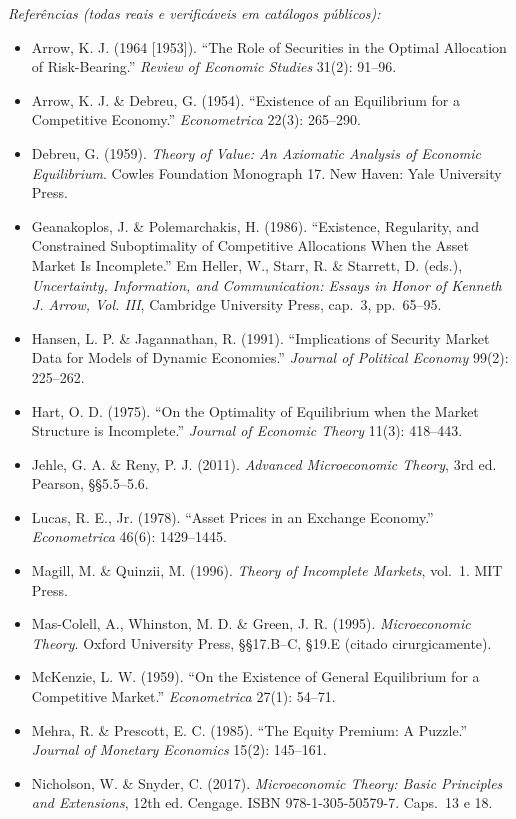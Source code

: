 \documentclass[11pt,addpoints]{exam}
\begin{document}
\begin{contextbox}
\medskip
\textit{Referências (todas reais e verificáveis em catálogos públicos):}
\begin{itemize}[noitemsep,topsep=0pt]
\item Arrow, K. J. (1964 [1953]). ``The Role of Securities in the Optimal Allocation of Risk-Bearing.'' \textit{Review of Economic Studies} 31(2): 91--96.
\item Arrow, K. J. \& Debreu, G. (1954). ``Existence of an Equilibrium for a Competitive Economy.'' \textit{Econometrica} 22(3): 265--290.
\item Debreu, G. (1959). \textit{Theory of Value: An Axiomatic Analysis of Economic Equilibrium}. Cowles Foundation Monograph 17. New Haven: Yale University Press.
\item Geanakoplos, J. \& Polemarchakis, H. (1986). ``Existence, Regularity, and Constrained Suboptimality of Competitive Allocations When the Asset Market Is Incomplete.'' Em Heller, W., Starr, R. \& Starrett, D. (eds.), \textit{Uncertainty, Information, and Communication: Essays in Honor of Kenneth J. Arrow, Vol. III}, Cambridge University Press, cap.~3, pp.~65--95.
\item Hansen, L. P. \& Jagannathan, R. (1991). ``Implications of Security Market Data for Models of Dynamic Economies.'' \textit{Journal of Political Economy} 99(2): 225--262.
\item Hart, O. D. (1975). ``On the Optimality of Equilibrium when the Market Structure is Incomplete.'' \textit{Journal of Economic Theory} 11(3): 418--443.
\item Jehle, G. A. \& Reny, P. J. (2011). \textit{Advanced Microeconomic Theory}, 3rd ed. Pearson, §§5.5--5.6.
\item Lucas, R. E., Jr. (1978). ``Asset Prices in an Exchange Economy.'' \textit{Econometrica} 46(6): 1429--1445.
\item Magill, M. \& Quinzii, M. (1996). \textit{Theory of Incomplete Markets}, vol.~1. MIT Press.
\item Mas-Colell, A., Whinston, M. D. \& Green, J. R. (1995). \textit{Microeconomic Theory}. Oxford University Press, §§17.B--C, §19.E (citado cirurgicamente).
\item McKenzie, L. W. (1959). ``On the Existence of General Equilibrium for a Competitive Market.'' \textit{Econometrica} 27(1): 54--71.
\item Mehra, R. \& Prescott, E. C. (1985). ``The Equity Premium: A Puzzle.'' \textit{Journal of Monetary Economics} 15(2): 145--161.
\item Nicholson, W. \& Snyder, C. (2017). \textit{Microeconomic Theory: Basic Principles and Extensions}, 12th ed. Cengage. ISBN 978-1-305-50579-7. Caps.~13 e 18.

\end{itemize}
\end{contextbox}
\end{document}
